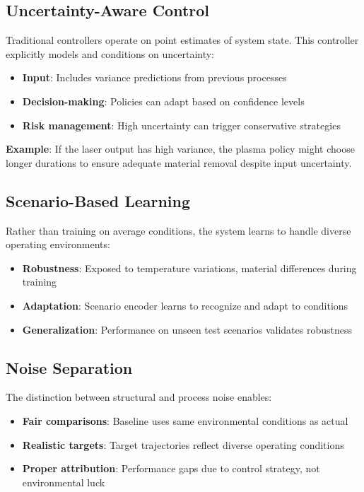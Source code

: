 \documentclass[11pt,a4paper]{article}
\begin{document}
\subsection{Uncertainty-Aware Control}

Traditional controllers operate on point estimates of system state. This controller explicitly models and conditions on uncertainty:

\begin{itemize}
    \item \textbf{Input}: Includes variance predictions from previous processes
    \item \textbf{Decision-making}: Policies can adapt based on confidence levels
    \item \textbf{Risk management}: High uncertainty can trigger conservative strategies
\end{itemize}

\textbf{Example}: If the laser output has high variance, the plasma policy might choose longer durations to ensure adequate material removal despite input uncertainty.

\subsection{Scenario-Based Learning}

Rather than training on average conditions, the system learns to handle diverse operating environments:

\begin{itemize}
    \item \textbf{Robustness}: Exposed to temperature variations, material differences during training
    \item \textbf{Adaptation}: Scenario encoder learns to recognize and adapt to conditions
    \item \textbf{Generalization}: Performance on unseen test scenarios validates robustness
\end{itemize}

\subsection{Noise Separation}

The distinction between structural and process noise enables:

\begin{itemize}
    \item \textbf{Fair comparisons}: Baseline uses same environmental conditions as actual
    \item \textbf{Realistic targets}: Target trajectories reflect diverse operating conditions
    \item \textbf{Proper attribution}: Performance gaps due to control strategy, not environmental luck
\end{itemize}
\end{document}
